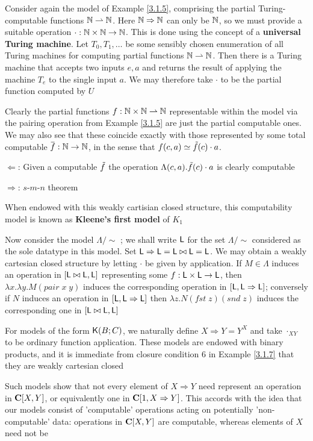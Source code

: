 \documentclass[11pt]{article}
\begin{document}
\begin{examplle}[]
Consider again the model of Example \ref{3.1.5}, comprising the partial Turing-computable
functions \(\mathbb{N}\rightharpoonup\mathbb{N}\). Here \(\mathbb{N}\Rightarrow\mathbb{N}\) can only be \(\mathbb{N}\), so we must provide a suitable
operation \(\cdot:\mathbb{N}\times\mathbb{N}\to\mathbb{N}\). This is done using the concept of a \textbf{universal Turing machine}.
Let \(T_0, T_1,\dots\)  be some sensibly chosen enumeration of all Turing machines for computing
partial functions \(\mathbb{N}\rightharpoonup\mathbb{N}\). Then there is a Turing machine that accepts two inputs \(e,a\) and
returns the result of applying the machine \(T_e\) to the single input \(a\). We may therefore
take \(\cdot\) to be the partial function computed by \(U\)

Clearly the partial functions \(f:\mathbb{N}\times\mathbb{N}\rightharpoonup\mathbb{N}\)  representable within the model via the pairing
operation from Example \ref{3.1.5} are just the partial computable ones. We may also see that
these coincide exactly with those represented by some total computable \(\barf:\N\to\N\), in the
sense that \(f(c,a)\simeq\tilde{f}(c)\cdot a\).

\(\Leftarrow\): Given a computable \(\tilde{f}\) the operation \(\Lambda(c,a).\tilde{f}(c)\cdot a\) is clearly computable

\(\Rightarrow\): \(s\)-\(m\)-\(n\) theorem

When endowed with this weakly cartisian closed structure, this computability model is known as
\textbf{Kleene's first model} of \(K_1\)
\end{examplle}

\begin{examplle}[]
\label{3.1.10}
Now consider the model \(\Lambda/\sim\) ; we shall write \(\textsf{L}\) for the set \(\Lambda/\sim\) considered as the
sole datatype in this model. Set \(\textsf{L}\Rightarrow\textsf{L}=\textsf{L}\bowtie\textsf{L}=\textsf{L}\). We may obtain a weakly cartesian
closed structure by letting \(\cdot\) be given by application. If \(M\in\Lambda\) induces an operation
in \([\textsf{L}\bowtie \textsf{L},\textsf{L}]\) representing some \(f:\textsf{L}\times\textsf{L}\to\textsf{L}\), then \(\lambda x.\lambda y.M(pair\;x\;y)\)
induces the corresponding operation in \([\textsf{L},\textsf{L}\Rightarrow\textsf{L}]\); conversely if \(N\) induces an
operation in \([\textsf{L},\textsf{L}\Rightarrow\textsf{L}]\) then \(\lambda z.N(fst\;z)(snd\;z)\) induces the corresponding one
in \([\textsf{L}\bowtie\textsf{L},\textsf{L}]\)
\end{examplle}

\begin{examplle}[]
For models of the form \(\textsf{K}(B;C)\), we naturally define \(X\Rightarrow Y=Y^X\) and take \(\cdot_{XY}\) to be
ordinary function application. These models are endowed with binary products, and it is
immediate from closure condition 6 in Example \ref{3.1.7} that they are weakly cartesian closed

Such models show that not every element of \(X\Rightarrow Y\) need represent an operation in \(\operatorname{\textbf{C}}[X,Y]\),
or equivalently one in \(\operatorname{\textbf{C}}[1,X\Rightarrow Y]\). This accords with the idea that our models consist of
'computable' operations acting on potentially 'non-computable' data: operations in \(\operatorname{\textbf{C}}[X,Y]\)
are computable, whereas elements of \(X\) need not be
\end{examplle}
\end{document}
